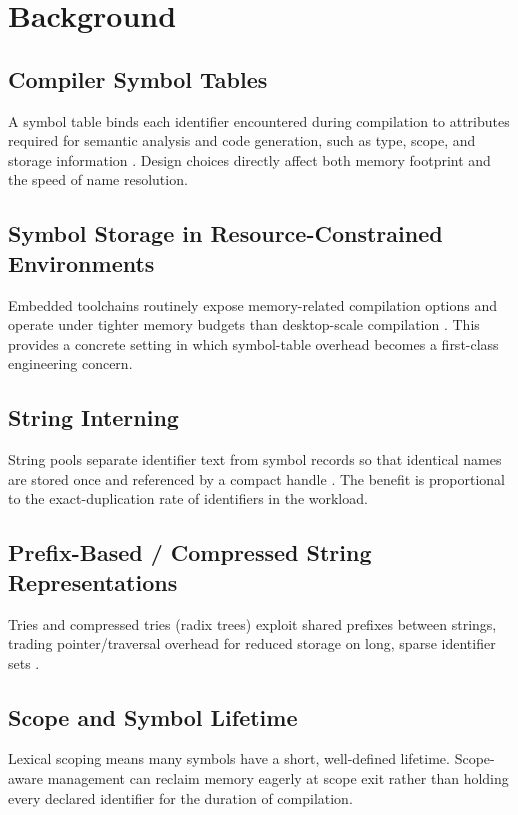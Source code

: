 \documentclass[conference]{IEEEtran}
\begin{document}
\section{Background}
\subsection{Compiler Symbol Tables}
A symbol table binds each identifier encountered during compilation to
attributes required for semantic analysis and code generation, such as type,
scope, and storage information \cite{aho}. Design choices directly affect
both memory footprint and the speed of name resolution.

\subsection{Symbol Storage in Resource-Constrained Environments}
Embedded toolchains routinely expose memory-related compilation options and
operate under tighter memory budgets than desktop-scale compilation
\cite{gcc-msp430}. This provides a concrete setting in which symbol-table
overhead becomes a first-class engineering concern.

\subsection{String Interning}
String pools separate identifier text from symbol records so that identical
names are stored once and referenced by a compact handle
\cite{jones-notes,rust-interning}. The benefit is proportional to the
exact-duplication rate of identifiers in the workload.

\subsection{Prefix-Based / Compressed String Representations}
Tries and compressed tries (radix trees) exploit shared prefixes between
strings, trading pointer/traversal overhead for reduced storage on long,
sparse identifier sets \cite{liu-lab2}.

\subsection{Scope and Symbol Lifetime}
Lexical scoping means many symbols have a short, well-defined lifetime.
Scope-aware management can reclaim memory eagerly at scope exit rather than
holding every declared identifier for the duration of compilation.
\end{document}
